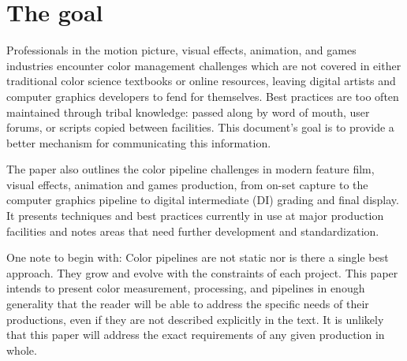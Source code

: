 \section{The goal}

Professionals in the motion picture, visual effects, animation, and games industries encounter color management challenges which are not covered in either traditional color science textbooks or online resources, leaving digital artists and computer graphics developers to fend for themselves. Best practices are too often maintained through tribal knowledge: passed along by word of mouth, user forums, or scripts copied between facilities. This document’s goal is to provide a better mechanism for communicating this information.

The paper also outlines the color pipeline challenges in modern feature film, visual effects, animation and games production, from on-set capture to the computer graphics pipeline to digital intermediate (DI) grading and final display. It presents techniques and best practices currently in use at major production facilities and notes areas that need further development and standardization.

One note to begin with: Color pipelines are not static nor is there a single best approach. They grow and evolve with the constraints of each project. This paper intends to present color measurement, processing, and pipelines in enough generality that the reader will be able to address the specific needs of their productions, even if they are not described explicitly in the text. It is unlikely that this paper will address the exact requirements of any given production in whole.

